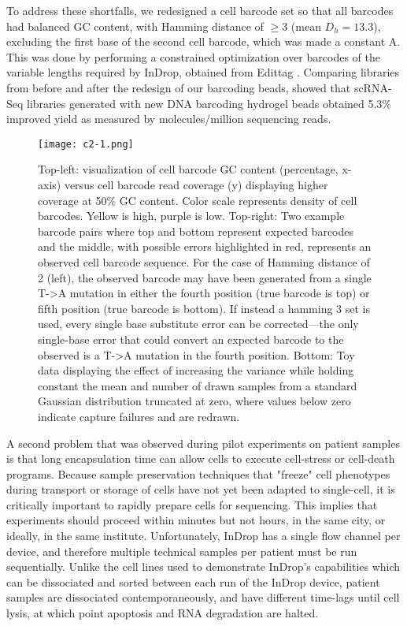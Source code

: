 To address these shortfalls, we redesigned a cell barcode set so that all barcodes had balanced GC content, with Hamming distance of $\ge3$ (mean $D_h = 13.3$), excluding the first base of the second cell barcode, which was made a constant A.
This was done by performing a constrained optimization over barcodes of the variable lengths required by InDrop, obtained from Edittag \citep{Faircloth2012}.
Comparing libraries from before and after the redesign of our barcoding beads, showed that scRNA-Seq libraries generated with new DNA barcoding hydrogel beads obtained 5.3\% improved yield as measured by molecules/million sequencing reads. 

\begin{figure} 
\centering
\texttt{[image: c2-1.png]} 
\caption{Top-left: visualization of cell barcode GC content (percentage, x-axis) versus cell barcode read coverage (y) displaying higher coverage at 50\% GC content. 
  Color scale represents density of cell barcodes. Yellow is high, purple is low.  
  Top-right: Two example barcode pairs where top and bottom represent expected barcodes and the middle, with possible errors highlighted in red, represents an observed cell barcode sequence. For the case of Hamming distance of 2 (left), the observed barcode may have been generated from a single T->A mutation in either the fourth position (true barcode is top) or fifth position (true barcode is bottom). If instead a hamming 3 set is used, every single base substitute error can be corrected---the only single-base error that could convert an expected barcode to the observed is a T->A mutation in the fourth position. Bottom: Toy data displaying the effect of increasing the variance while holding constant the mean and number of drawn samples from a standard Gaussian distribution truncated at zero, where values below zero indicate capture failures and are redrawn.}
\label{fig:c2-1}
\end{figure}

A second problem that was observed during pilot experiments on patient samples is that long encapsulation time can allow cells to execute cell-stress or cell-death programs.
Because sample preservation techniques that "freeze" cell phenotypes during transport or storage of cells have not yet been adapted to single-cell, it is critically important to rapidly prepare cells for sequencing. 
This implies that experiments should proceed within minutes but not hours, in the same city, or ideally, in the same institute. 
Unfortunately, InDrop has a single flow channel per device, and therefore multiple technical samples per patient must be run sequentially. 
Unlike the cell lines used to demonstrate InDrop's capabilities which can be dissociated and sorted between each run of the InDrop device, patient samples are dissociated contemporaneously, and have different time-lags until cell lysis, at which point apoptosis and RNA degradation are halted.

